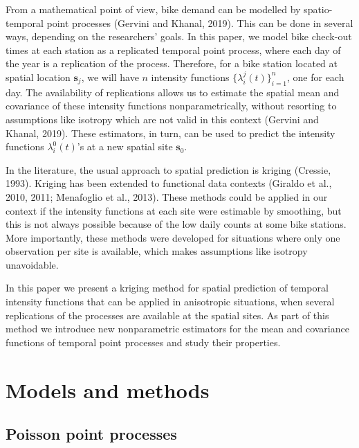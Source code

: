\documentclass[titlepage,12pt]{article}
\begin{document}
From a mathematical point of view, bike demand can be modelled by
spatio-temporal point processes (Gervini and Khanal, 2019). This can be done
in several ways, depending on the researchers' goals. In this paper, we
model bike check-out times at each station as a replicated temporal point
process, where each day of the year is a replication of the process.
Therefore, for a bike station located at spatial location $\mathbf{s}_{j}$,
we will have $n$ intensity functions $\{\lambda _{i}^{j}(t)\}_{i=1}^{n}$,
one for each day. The availability of replications allows us to estimate the
spatial mean and covariance of these intensity functions nonparametrically,
without resorting to assumptions like isotropy which are not valid in this
context (Gervini and Khanal, 2019). These estimators, in turn, can be used
to predict the intensity functions $\lambda _{i}^{0}(t)$'s at a new spatial
site $\mathbf{s}_{0}$.

In the literature, the usual approach to spatial prediction is kriging
(Cressie, 1993). Kriging has been extended to functional data contexts
(Giraldo et al., 2010, 2011; Menafoglio et al., 2013). These methods could
be applied in our context if the intensity functions at each site were
estimable by smoothing, but this is not always possible because of the low
daily counts at some bike stations. More importantly, these methods were
developed for situations where only one observation per site is available,
which makes assumptions like isotropy unavoidable.

In this paper we present a kriging method for spatial prediction of temporal
intensity functions that can be applied in anisotropic situations, when
several replications of the processes are available at the spatial sites. As
part of this method we introduce new nonparametric estimators for the mean
and covariance functions of temporal point processes and study their
properties.

\section{Models and methods}

\subsection{Poisson point processes\label{sec:Point_processes}}
\end{document}
